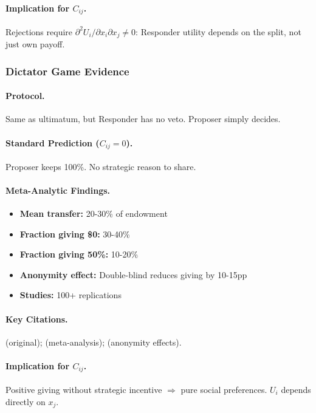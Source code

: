 \paragraph{Implication for $C_{ij}$.}
Rejections require $\partial^2 U_i / \partial x_i \partial x_j \neq 0$:
Responder utility depends on the split, not just own payoff.


\subsubsection{Dictator Game Evidence}

\paragraph{Protocol.}
Same as ultimatum, but Responder has no veto. Proposer simply decides.

\paragraph{Standard Prediction ($C_{ij} = 0$).}
Proposer keeps 100\%. No strategic reason to share.

\paragraph{Meta-Analytic Findings.}
\begin{itemize}[nosep]
    \item \textbf{Mean transfer:} 20-30\% of endowment
    \item \textbf{Fraction giving \$0:} 30-40\%
    \item \textbf{Fraction giving 50\%:} 10-20\%
    \item \textbf{Anonymity effect:} Double-blind reduces giving by 10-15pp
    \item \textbf{Studies:} 100+ replications
\end{itemize}

\paragraph{Key Citations.}
\citet{kahneman1986} (original); \citet{engel2011} (meta-analysis);
\citet{listbardsley2006} (anonymity effects).

\paragraph{Implication for $C_{ij}$.}
Positive giving without strategic incentive $\Rightarrow$ pure social preferences.
$U_i$ depends directly on $x_j$.

